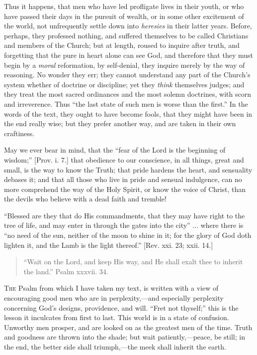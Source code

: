 Thus it happens, that men who have led profligate
lives in their youth, or who have passed their days in
the pursuit of wealth, or in some other excitement of the
world, not unfrequently settle down into \emph{heresies}
in their latter years. Before, perhaps, they professed
nothing, and suffered themselves to be called Christians
and members of the Church; but at length, roused to
inquire after truth, and forgetting that the pure in
heart alone can see God, and therefore that they must
begin by a \emph{moral} reformation, by self-denial,
they inquire merely by the way of reasoning. No wonder
they err; they cannot understand any part of the Church's
system whether of doctrine or discipline; yet they \emph{think}
themselves judges; and they treat the most sacred
ordinances and the most solemn doctrines, with scorn and
irreverence. Thus ``the last state of such men is
worse than the first.'' In the words of the text,
they ought to have become fools, that they might have
been in the end really wise; but they prefer another way,
and are taken in their own craftiness.

May we ever bear in mind, that the ``fear of the
Lord is the beginning of wisdom;'' [Prov. i. 7.] that
obedience to our conscience, in all things, great and
small, is the way to know the Truth; that pride hardens
the heart, and sensuality debases it; and that all those
who live in pride and sensual indulgence, can no more
comprehend the way of the Holy Spirit, or know the voice
of Christ, than the devils who believe with a dead faith
and tremble!

``Blessed are they that do His commandments, that
they may have right to the tree of life, and may enter in
through the gates into the city'' ... where there is
``no need of the sun, neither of the moon to shine in
it; for the glory of God doth lighten it, and the Lamb is
the light thereof.'' [Rev. xxi. 23; xxii. 14.]


\begin{quote}

``Wait on the Lord, and keep His way, and He
shall exalt thee to inherit the land.''
Psalm xxxvii. 34.

\end{quote}

T\textsc{he} Psalm from which I have taken my text, is written
with a view of encouraging good men who are in
perplexity,—and especially perplexity concerning
God's designs, providence, and will. ``Fret not
thyself;'' this is the lesson it inculcates from
first to last. This world is in a state of confusion.
Unworthy men prosper, and are looked on as the greatest
men of the time. Truth and goodness are thrown into the
shade; but wait patiently,—peace, be still; in the
end, the better side shall triumph,—the meek shall
inherit the earth.


